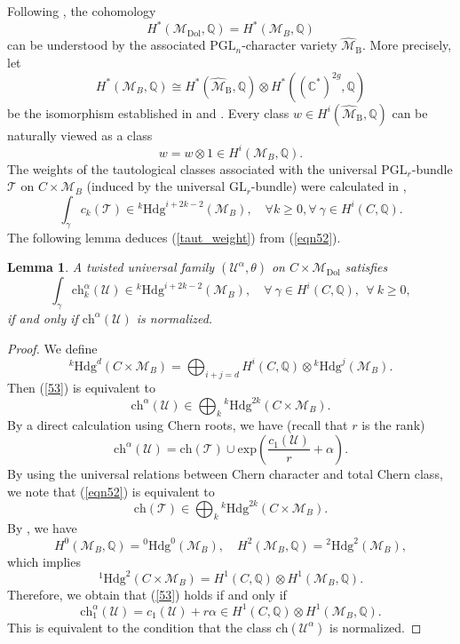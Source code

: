 \documentclass[11pt]{amsart}
\theoremstyle{plain}
\newtheorem{lem}[thm]{Lemma}
\theoremstyle{definition}
\theoremstyle{remark}
\newcommand{\BC}{{\mathbb{C}}}
\newcommand{\BQ}{{\mathbb{Q}}}
\newcommand{\CM}{{\mathcal M}}
\newcommand{\CT}{{\mathcal T}}
\newcommand{\CU}{{\mathcal U}}
\begin{document}
Following \cite{HRV, HT1, Shende}, the cohomology 
\begin{equation}\label{eqn89}
H^*(\CM_{\mathrm{Dol}}, \BQ) = H^*(\CM_B, \BQ)
\end{equation}
can be understood by the associated $\mathrm{PGL}_n$-character variety $\hat{\CM}_{\mathrm{B}}$. More precisely, let
\[
H^*(\CM_B, \BQ) \cong H^*(\hat{\CM}_{\mathrm{B}}, \BQ) \otimes H^*((\BC^*)^{2g}, \BQ)
\]
be the isomorphism established in \cite[Section 1]{HT1} and \cite[Theorem 2.2.12]{HRV}. Every class $w \in H^i(\hat{\CM}_{\mathrm{B}}, \BQ)$ can be naturally viewed as a class
\[
w = w\otimes 1 \in H^i(\CM_B, \BQ).
\]
The weights of the tautological classes associated with the universal $\mathrm{PGL}_r$-bundle $\CT$ on $C\times \CM_B$ (induced by the universal $\mathrm{GL}_r$-bundle) were calculated in \cite{Shende}, 
\begin{equation}\label{eqn52}
\int_\gamma c_k(\CT) \in {^k\mathrm{Hdg}^{i+2k-2}(\CM_B)},\quad { \forall k \geq 0}, \forall~\gamma \in H^i(C, \BQ).
\end{equation}
The following lemma deduces (\ref{taut_weight}) from (\ref{eqn52}).

\begin{lem}\label{lem3.1}
A twisted universal family $(\CU^\alpha, \theta)$ on $C \times {\CM}_{\mathrm{Dol}}$ satisfies
\begin{equation}\label{53}
\int_\gamma \mathrm{ch}^\alpha_k(\CU) \in {^k\mathrm{Hdg}^{i+2k-2}(\CM_B)},\quad \forall~\gamma \in H^i(C, \BQ),~~ \forall~ k\geq 0,
\end{equation}
if and only if $\mathrm{ch}^\alpha(\CU)$ is normalized.
\end{lem}

\begin{proof}
We define
\[
{^k\mathrm{Hdg}^{d}(C\times \CM_B)} = \bigoplus_{i+j=d} H^i(C, \BQ) \otimes {^k\mathrm{Hdg}^{j}(\CM_B)}.
\]
Then (\ref{53}) is equivalent to
\[
\mathrm{ch}^\alpha(\CU) \in \bigoplus_k {^k\mathrm{Hdg}^{2k}(C\times \CM_B)}.
\]
By a direct calculation using Chern roots, we have (recall that $r$ is the rank)
\[
\mathrm{ch}^\alpha(\CU) = \mathrm{ch}(\CT) \cup \mathrm{exp}\left(\frac{c_1(\CU)}{r}+ \alpha\right).
\]
By using the universal relations between Chern character and total Chern class, we note that (\ref{eqn52}) is equivalent to \[
\mathrm{ch}(\CT) \in \bigoplus_k {^k\mathrm{Hdg}^{2k}(C\times \CM_B)}.
\]
By \cite{Shende}, we have
\[
H^0(\CM_B, \BQ) = {^0\mathrm{Hdg}^{0}(\CM_B)}, \quad H^2(\CM_B, \BQ) = {^2\mathrm{Hdg}^{2}(\CM_B)},
\]
which implies 
\[
{^1\mathrm{Hdg}^{2}(C\times \CM_B)} = H^1(C, \BQ)\otimes H^1(\CM_B ,\BQ).
\]
Therefore, we obtain that (\ref{53}) holds if and only if
\[
\mathrm{ch}_1^\alpha(\CU)= c_1(\CU) + r\alpha \in H^1(C, \BQ) \otimes H^1(\CM_B, \BQ).
\]
This is equivalent to the condition that the class $\mathrm{ch}(\CU^\alpha)$ is normalized.
\end{proof}
\end{document}
